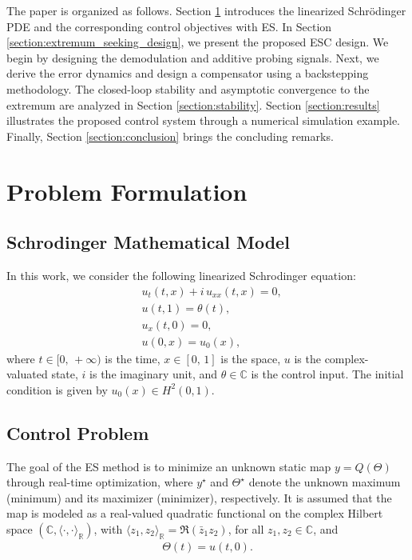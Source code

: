 \documentclass[letterpaper, 10 pt, conference]{ieeeconf}  %
\begin{document}
The paper is organized as follows. Section \ref{section:problem} introduces the linearized Schrödinger PDE and the corresponding control objectives with ES. In Section \ref{section:extremum_seeking_design}, we present the proposed ESC design. We begin by designing the demodulation and additive probing signals. Next, we derive the error dynamics and design a compensator using a backstepping methodology. The closed-loop stability and asymptotic convergence to the extremum are analyzed in Section \ref{section:stability}. Section \ref{section:results} illustrates the proposed control system through a numerical simulation example. Finally, Section \ref{section:conclusion} brings the concluding remarks. 

\section{Problem Formulation}\label{section:problem}
\subsection{Schrodinger Mathematical Model}
In this work, we consider the following linearized Schrodinger equation:
\begin{align}
    &u_t(t,x) + i\,u_{xx}(t,x)=0, \label{eq:schrodingerPDE}\\
    &u(t,1) = \theta(t), \label{eq:control_schrodinger}\\
    &u_{x}(t,0) = 0,\label{eq:schrodinger_bc0}\\
    &u(0,x) = u_0 (x),\label{eq:schrodinger_in}
\end{align}
\noindent where $t\in [0,\, +\infty)$ is the time, $x\in[0,\, 1]$ is the space, $u$ is the complex-valuated state, $i$ is the imaginary unit, and $\theta\in \mathbb{C}$ is the control input. The initial condition is given by $u_0 (x)\in H^{2}(0,1)$.

\subsection{Control Problem}\label{section:control_problem}

The goal of the ES method is to minimize an unknown static map \( y = Q(\Theta) \) through real-time optimization, where \( y^{\star} \) and \( \Theta^{\star} \) denote the unknown maximum (minimum) and its maximizer (minimizer), respectively. It is assumed that the map is modeled as a real-valued quadratic functional on the complex Hilbert space \( (\mathbb{C}, \langle \cdot, \cdot \rangle_{\mathbb{R}}) \), with  $\langle z_1, z_2 \rangle_{\mathbb{R}} = \Re(\bar{z}_1z_2)$, for all $z_{1},z_{2}\in\mathbb{C}$, and 
\begin{align}
    \Theta(t) = u(t,0).
\end{align}
\end{document}
